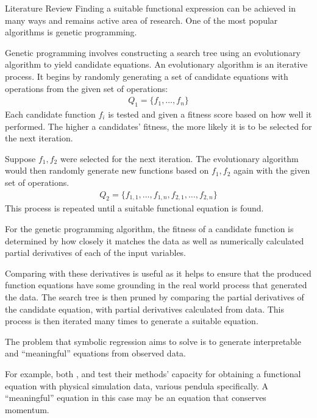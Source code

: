 \documentclass[12pt]{amsbook}
\begin{document}
\begin{chapter}{Literature Review}
        Finding a suitable functional expression can be achieved in many ways and remains active area of research. One of the most popular algorithms is genetic programming\cite{schmidt2009distilling}. 
        
        Genetic programming involves constructing a search tree using an evolutionary algorithm to yield candidate equations. An evolutionary algorithm is an iterative process. It begins by randomly generating a set of candidate equations with operations from the given set of operations:
        \begin{align}
            Q_1=\{f_1,\dots,f_n\}
        \end{align}
        Each candidate function $f_i$ is tested and given a fitness score based on how well it performed. The higher a candidates' fitness, the more likely it is to be selected for the next iteration.

        Suppose $f_1,f_2$ were selected for the next iteration. The evolutionary algorithm would then randomly generate new functions based on $f_1,f_2$ again with the given set of operations.
        \begin{align}
            Q_2=\{f_{1,1},\dots,f_{1,n}, f_{2,1},\dots,f_{2,n}\}
        \end{align}
        This process is repeated until a suitable functional equation is found. 

        For the genetic programming algorithm, the fitness of a candidate function is determined by how closely it matches the data as well as numerically calculated partial derivatives of each of the input variables. 
        
        Comparing with these derivatives is useful as it helps to ensure that the produced function equations have some grounding in the real world process that generated the data. The search tree is then pruned by comparing the partial derivatives of the candidate equation, with partial derivatives calculated from data. This process is then iterated many times to generate a suitable equation.

        The problem that symbolic regression aims to solve is to generate interpretable and ``meaningful'' equations from observed data. 
        
        For example, both \cite{schmidt2009distilling}, and \cite{bongard2007automated} test their methods' capacity for obtaining a functional equation with physical simulation data, various pendula specifically. A ``meaningful'' equation in this case may be an equation that conserves momentum.


\end{chapter}
\end{document}
